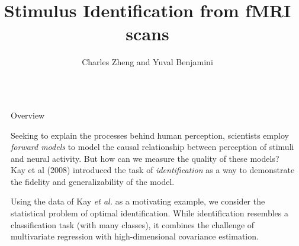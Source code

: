 \documentclass[final]{beamer}
\title{Stimulus Identification from fMRI scans}
\author{Charles Zheng and Yuval Benjamini} %
\institute{Stanford University, Department of Statistics} %
\newlength{\sepwid}
\newlength{\onecolwid}
\begin{document}

\setlength{\belowcaptionskip}{2ex} %
\setlength\belowdisplayshortskip{2ex} %

\begin{frame}[t] %

\begin{columns}[t] %

\begin{column}{\sepwid}\end{column} %

\begin{column}{\onecolwid} %



\begin{alertblock}{Overview}
\vspace{0.3in}

Seeking to explain the processes behind human perception, scientists
employ \emph{forward models} to model the causal relationship between
perception of stimuli and neural activity.  But how can we measure the quality of
these models?  Kay et al (2008) introduced the
task of \emph{identification} as a way to demonstrate the fidelity and
generalizability of the model.
\vspace{0.6in}

Using the data of Kay \emph{et al.} as a motivating example, we
consider the statistical problem of optimal identification.  While
identification resembles a classification task (with
many classes), it combines the challenge of multivariate regression
with high-dimensional covariance estimation.
\end{alertblock}


\end{column}
\end{columns}
\end{frame}
\end{document}
